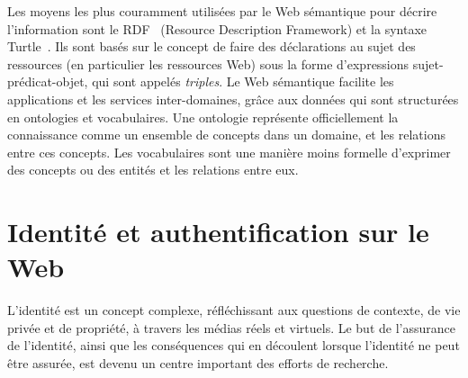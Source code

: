 Les moyens les plus couramment utilisées par le Web sémantique pour décrire l'information sont le RDF~\cite{klyne2004resource} (Resource Description Framework) et la syntaxe Turtle~\cite{beckett2008turtle}. Ils sont basés sur le concept de faire des déclarations au sujet des ressources (en particulier les ressources Web) sous la forme d'expressions sujet-prédicat-objet, qui sont appelés \textit{triples}. Le Web sémantique facilite les applications et les services inter-domaines, grâce aux données qui sont structurées en ontologies et vocabulaires. Une ontologie représente officiellement la connaissance comme un ensemble de concepts dans un domaine, et les relations entre ces concepts. Les vocabulaires sont une manière moins formelle d'exprimer des concepts ou des entités et les relations entre eux.

\section*{Identité et authentification sur le Web}
L'identité est un concept complexe, réfléchissant aux questions de contexte, de vie privée et de propriété, à travers les médias réels et virtuels. Le but de l'assurance de l'identité, ainsi que les conséquences qui en découlent lorsque l'identité ne peut être assurée, est devenu un centre important des efforts de recherche.\\



